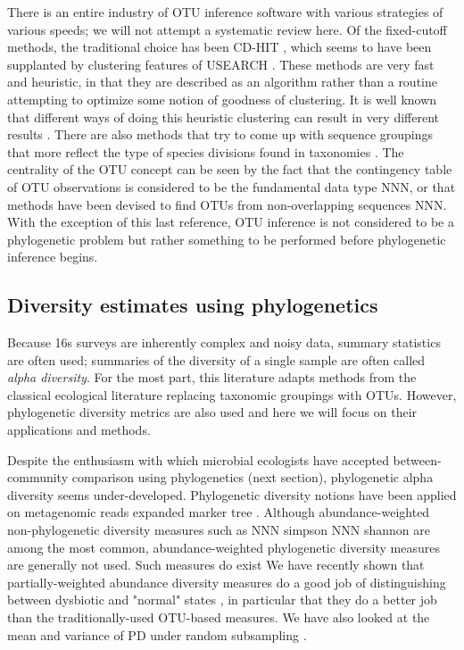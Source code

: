 \documentclass{amsart}
\begin{document}
There is an entire industry of OTU inference software with various strategies of various speeds; we will not attempt a systematic review here.
Of the fixed-cutoff methods, the traditional choice has been CD-HIT \citep{li2006cdhit}, which seems to have been supplanted by clustering features of USEARCH \citep{edgar2010usearch}.
These methods are very fast and heuristic, in that they are described as an algorithm rather than a routine attempting to optimize some notion of goodness of clustering.
It is well known that different ways of doing this heuristic clustering can result in very different results \citep{white2010alignment}.
There are also methods that try to come up with sequence groupings that more reflect the type of species divisions found in taxonomies \citep{navlakha2009finding}.
The centrality of the OTU concept can be seen by the fact that the contingency table of OTU observations is considered to be the fundamental data type NNN, or that methods have been devised to find OTUs from non-overlapping sequences NNN.
With the exception of this last reference, OTU inference is not considered to be a phylogenetic problem but rather something to be performed before phylogenetic inference begins.


\subsection{Diversity estimates using phylogenetics}
Because 16s surveys are inherently complex and noisy data, summary statistics are often used; summaries of the diversity of a single sample are often called \emph{alpha diversity}.
For the most part, this literature adapts methods from the classical ecological literature replacing taxonomic groupings with OTUs.
However, phylogenetic diversity metrics are also used and here we will focus on their applications and methods.

Despite the enthusiasm with which microbial ecologists have accepted between-community comparison using phylogenetics (next section), phylogenetic alpha diversity seems under-developed.
Phylogenetic diversity notions have been applied on metagenomic reads expanded marker tree \citep{kembel2011phylogenetic}.
Although abundance-weighted non-phylogenetic diversity measures such as NNN simpson NNN shannon are among the most common, abundance-weighted phylogenetic diversity measures are generally not used.
Such measures do exist \citep{chao2010phylogenetic}
We have recently shown that partially-weighted abundance diversity measures do a good job of distinguishing between dysbiotic and "normal" states \citep{mccoy2013abundance}, in particular that they do a better job than the traditionally-used OTU-based measures.
We have also looked at the mean and variance of PD under random subsampling \citep{nipperess2013mean}.
\end{document}
